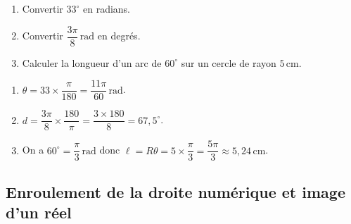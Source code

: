 \begin{methode}
	\nline
	\begin{enumerate}[label=\alph*)]
		\item Convertir $33^\circ$ en radians.
		\item Convertir $\dfrac{3\pi}{8}\,\text{rad}$ en degrés.
		\item Calculer la longueur d'un arc de $60^\circ$ sur un cercle de rayon $5\,\text{cm}$.
	\end{enumerate}

	\begin{correction}
		\nline
		\begin{enumerate}[label=\alph*)]
			\item $\theta = 33 \times \dfrac{\pi}{180} = \dfrac{11\pi}{60}\,\text{rad}$.
			\item $d = \dfrac{3\pi}{8} \times \dfrac{180}{\pi} = \dfrac{3 \times 180}{8} = 67{,}5^\circ$.
			\item On a $60^\circ = \dfrac{\pi}{3}\,\text{rad}$ donc $\ell = R\theta = 5 \times \dfrac{\pi}{3} = \dfrac{5\pi}{3} \approx 5{,}24\,\text{cm}$.
		\end{enumerate}
	\end{correction}
\end{methode}

\subsection{Enroulement de la droite numérique et image d'un réel}

